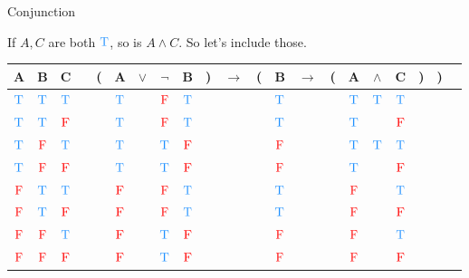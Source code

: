 \documentclass[
  ignorenonframetext,
]{beamer}
\renewcommand{\,}{\text{, }}
\def\True{\textcolor{dodgerblue}{\text{T}}}
\def\False{\textcolor{red}{\text{F}}}
\begin{document}
\begin{frame}{Conjunction}
\protect\hypertarget{conjunction}{}

If \(A, C\) are both \(\True\), so is \(A \wedge C\). So let's include
those.

\begin{center}
\bigskip
\begin{tabular}{@{ }c@{ }@{ }c@{ }@{ }c | c@{ }@{}c@{}@{ }c@{ }@{ }c@{ }@{ }c@{ }@{ }c@{ }@{}c@{}@{ }c@{ }@{}c@{}@{ }c@{ }@{ }c@{ }@{}c@{}@{ }c@{ }@{ }c@{ }@{ }c@{ }@{}c@{}@{}c@{}@{ }c}
A & B & C &  & ( & A & $\vee$ & $\neg$ & B & ) & $\rightarrow$ & ( & B & $\rightarrow$ & ( & A & $\wedge$ & C & ) & ) & \\
\hline 
 $\True$ & $\True$ & $\True$ &  &  & $\True$ && $\False$ & $\True$ &  &&  & $\True$ &&  & $\True$ & $\True$ & $\True$ &  &  & \\
 $\True$ & $\True$ & $\False$ &  &  & $\True$ && $\False$ & $\True$ &  &&  & $\True$ &&  & $\True$ && $\False$ &  &  & \\
 $\True$ & $\False$ & $\True$ &  &  & $\True$ && $\True$ & $\False$ &  &&  & $\False$ &&  & $\True$ & $\True$ & $\True$ &  &  & \\
 $\True$ & $\False$ & $\False$ &  &  & $\True$ && $\True$ & $\False$ &  &&  & $\False$ &&  & $\True$ && $\False$ &  &  & \\
 $\False$ & $\True$ & $\True$ &  &  & $\False$ && $\False$ & $\True$ &  &&  & $\True$ &&  & $\False$ && $\True$ &  &  & \\
 $\False$ & $\True$ & $\False$ &  &  & $\False$ && $\False$ & $\True$ &  &&  & $\True$ &&  & $\False$ && $\False$ &  &  & \\
 $\False$ & $\False$ & $\True$ &  &  & $\False$ && $\True$ & $\False$ &  &&  & $\False$ &&  & $\False$ && $\True$ &  &  & \\
 $\False$ & $\False$ & $\False$ &  &  & $\False$ && $\True$ & $\False$ &  &&  & $\False$ &&  & $\False$ && $\False$ &  &  & \\
\end{tabular}
\bigskip
\end{center}

\end{frame}
\end{document}
